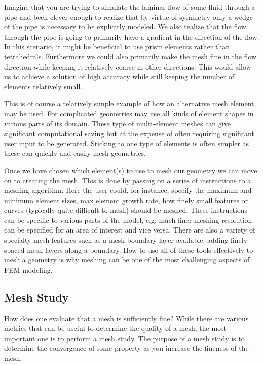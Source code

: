 Imagine that you are trying to simulate the laminar flow of some fluid through a pipe and been clever enough to realize that by virtue of symmetry only a wedge of the pipe is necessary to be explicitly modeled.
We also realize that the flow through the pipe is going to primarily have a gradient in the direction of the flow.
In this scenario, it might be beneficial to use prism elements rather than tetrahedrals.
Furthermore we could also primarily make the mesh fine in the flow direction while keeping it relatively coarse in other directions.
This would allow us to achieve a solution of high accuracy while still keeping the number of elements relatively small.\par

This is of course a relatively simple example of how an alternative mesh element may be used.
For complicated geometries may use all kinds of element shapes in various parts of its domain.
These type of multi-element meshes can give significant computational saving but at the expense of often requiring significant user input to be generated.
Sticking to one type of elements is often simpler as these can quickly and easily mesh geometries.\par

Once we have chosen which element(s) to use to mesh our geometry we can move on to creating the mesh.
This is done by passing on a series of instructions to a meshing algorithm.
Here the user could, for instance, specify the maximum and minimum element sizes, max element growth rate, how finely small features or curves (typically quite difficult to mesh) should be meshed.
These instructions can be specific to various parts of the model, e.g. much finer meshing resolution can be specified for an area of interest and vice versa.
There are also a variety of specialty mesh features such as a mesh boundary layer available: adding finely spaced mesh layers along a boundary.
How to use all of these tools effectively to mesh a geometry is why meshing can be one of the most challenging aspects of FEM modeling.\par

\subsection{Mesh Study}\label{sec:mesh_study}

How does one evaluate that a mesh is sufficiently fine?
While there are various metrics that can be useful to determine the quality of a mesh, the most important one is to perform a mesh study.
The purpose of a mesh study is to determine the convergence of some property as you increase the fineness of the mesh.\par

